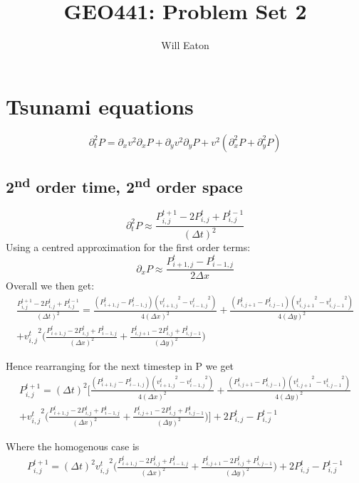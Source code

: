 \documentclass{article}
\title{GEO441: Problem Set 2}
\author{Will Eaton}
\begin{document}
\maketitle

\section{Tsunami equations}

\[\partial_t^2 P = \partial_x v^2 \partial_x P + \partial_y v^2 \partial_y P + v^2(\partial_x^2P + \partial_y^2P)\]

\subsection{2\textsuperscript{nd} order time, 2\textsuperscript{nd} order space}
\[\partial_t^2 P \approx \frac{P_{i,j}^{t+1} - 2P_{i,j}^{t} + P_{i,j}^{t-1}}{(\Delta t)^2}\]
Using a centred approximation for the first order terms: 
\[ \partial_x P \approx \frac{P_{i+1,j}^{t} - P_{i-1,j}^{t}}{2\Delta x}\]
Overall we then get: 
\begin{multline*}
\frac{P_{i,j}^{t+1} - 2P_{i,j}^{t} + P_{i,j}^{t-1}}{(\Delta t)^2} = \frac{(P_{i+1,j}^{t} - P_{i-1,j}^{t})({v_{i+1,j}^{t}}^2 - {v_{i-1,j}^{t}}^2)}{4(\Delta x)^2} + \frac{(P_{i,j+1}^{t} - P_{i,j-1}^{t})({v_{i,j+1}^{t}}^2 - {v_{i,j-1}^{t}}^2)}{4(\Delta y)^2} \\
+ {v_{i,j}^{t}}^2\Bigg( \frac{P_{i+1,j}^{t} - 2P_{i,j}^{t} + P_{i-1,j}^{t}}{(\Delta x)^2} + \frac{P_{i,j+1}^{t} - 2P_{i,j}^{t} + P_{i,j-1}^{t}}{(\Delta y)^2} \Bigg)
\end{multline*}

Hence rearranging for the next timestep in P we get 
\begin{multline*}
P_{i,j}^{t+1} = (\Delta t)^2\Bigg[\frac{(P_{i+1,j}^{t} - P_{i-1,j}^{t})({v_{i+1,j}^{t}}^2 - {v_{i-1,j}^{t}}^2)}{4(\Delta x)^2} + \frac{(P_{i,j+1}^{t} - P_{i,j-1}^{t})({v_{i,j+1}^{t}}^2 - {v_{i,j-1}^{t}}^2)}{4(\Delta y)^2} \\
+ {v_{i,j}^{t}}^2\Big( \frac{P_{i+1,j}^{t} - 2P_{i,j}^{t} + P_{i-1,j}^{t}}{(\Delta x)^2} + \frac{P_{i,j+1}^{t} - 2P_{i,j}^{t} + P_{i,j-1}^{t}}{(\Delta y)^2} \Big) \Bigg] + 2P_{i,j}^{t} - P_{i,j}^{t-1}
\end{multline*}

Where the homogenous case is 
\begin{multline*}
P_{i,j}^{t+1} = (\Delta t)^2{v_{i,j}^{t}}^2\Big( \frac{P_{i+1,j}^{t} - 2P_{i,j}^{t} + P_{i-1,j}^{t}}{(\Delta x)^2} + \frac{P_{i,j+1}^{t} - 2P_{i,j}^{t} + P_{i,j-1}^{t}}{(\Delta y)^2} \Big)  + 2P_{i,j}^{t} - P_{i,j}^{t-1}
\end{multline*}
\end{document}
